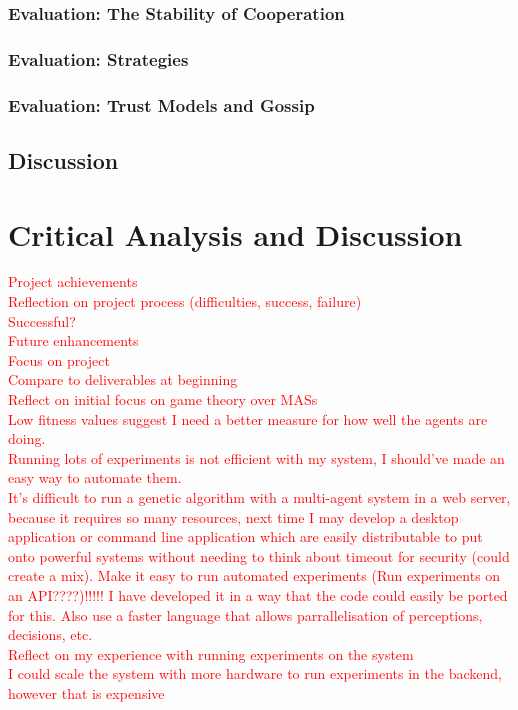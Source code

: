 \documentclass[]{final_report}
\begin{document}
\subsection{Evaluation: The Stability of Cooperation}

\subsection{Evaluation: Strategies}

\subsection{Evaluation: Trust Models and Gossip}


\section{Discussion}

\chapter{Critical Analysis and Discussion}
\textcolor{red}{Project achievements\\
Reflection on project process (difficulties, success, failure)\\
Successful?\\
Future enhancements\\
Focus on project\\
Compare to deliverables at beginning\\
Reflect on initial focus on game theory over MASs\\
Low fitness values suggest I need a better measure for how well the agents are doing.\\
Running lots of experiments is not efficient with my system, I should've made an easy way to automate them.\\
It's difficult to run a genetic algorithm with a multi-agent system in a web server, because it requires so many resources, next time I may develop a desktop application or command line application which are easily distributable to put onto powerful systems without needing to think about timeout for security (could create a mix). Make it easy to run automated experiments (Run experiments on an API????)!!!!! I have developed it in a way that the code could easily be ported for this. Also use a faster language that allows parrallelisation of perceptions, decisions, etc.\\
Reflect on my experience with running experiments on the system\\
I could scale the system with more hardware to run experiments in the backend, however that is expensive
}
\end{document}
